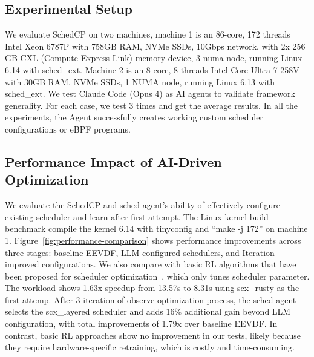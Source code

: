 \documentclass[preprint]{article}
\newcommand{\sys}{SchedCP\xspace}
\newcommand{\agent}{sched-agent\xspace}
\begin{document}
\subsection{Experimental Setup}

We evaluate \sys on two machines, machine 1 is an 86-core, 172 threads Intel Xeon 6787P with 758GB RAM, NVMe SSDs, 10Gbps network, with 2x 256 GB CXL (Compute Express Link) memory device, 3 numa node, running Linux 6.14 with sched\_ext. Machine 2 is an 8-core, 8 threads Intel Core Ultra 7 258V with 30GB RAM, NVMe SSDs, 1 NUMA node, running Linux 6.13 with sched\_ext. We test Claude Code (Opus 4) as AI agents to validate framework generality. For each case, we test 3 times and get the average results. In all the experiments, the Agent successfully creates working custom scheduler configurations or eBPF programs.

\subsection{Performance Impact of AI-Driven Optimization}


We evaluate the \sys and \agent's ability of effectively configure existing scheduler and learn after first attempt. The Linux kernel build benchmark compile the kernel 6.14 with tinyconfig and ``make -j 172'' on machine 1. Figure~\ref{fig:performance-comparison} shows performance improvements across three stages: baseline EEVDF, LLM-configured schedulers, and Iteration-improved configurations. We also compare with basic RL algorithms that have been proposed for scheduler optimization~\cite{corbet2025ml}, which only tunes scheduler parameter. The workload shows 1.63x speedup from 13.57s to 8.31s using scx\_rusty as the first attemp. After 3 iteration of observe-optimization process, the \agent selects the scx\_layered scheduler and adds 16\% additional gain beyond LLM configuration, with total improvements of 1.79x over baseline EEVDF. In contrast, basic RL approaches show no improvement in our tests, likely because they require hardware-specific retraining, which is costly and time-consuming.
\end{document}
